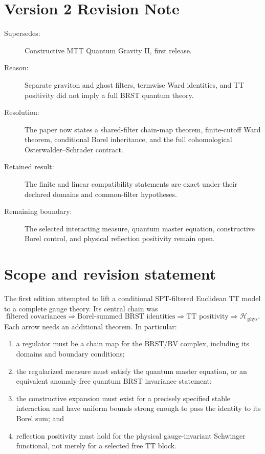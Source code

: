 \documentclass[11pt]{article}
\newcommand{\Hphys}{\mathcal H_{\mathrm{phys}}}
\begin{document}
\section*{Version 2 Revision Note}
\begin{description}
\item[Supersedes:] Constructive MTT Quantum Gravity II, first release.
\item[Reason:] Separate graviton and ghost filters, termwise Ward identities,
and TT positivity did not imply a full BRST quantum theory.
\item[Resolution:] The paper now states a shared-filter chain-map theorem,
finite-cutoff Ward theorem, conditional Borel inheritance, and the full
cohomological Osterwalder--Schrader contract.
\item[Retained result:] The finite and linear compatibility statements are
exact under their declared domains and common-filter hypotheses.
\item[Remaining boundary:] The selected interacting measure, quantum master
equation, constructive Borel control, and physical reflection positivity
remain open.
\end{description}

\tableofcontents

\section{Scope and revision statement}

The first edition attempted to lift a conditional SPT-filtered Euclidean TT
model to a complete gauge theory.  Its central chain was
\[
 \text{filtered covariances}
 \Longrightarrow \text{Borel-summed BRST identities}
 \Longrightarrow \text{TT positivity}
 \Longrightarrow \Hphys .
\]
Each arrow needs an additional theorem.  In particular:
\begin{enumerate}[label=\textup{(\roman*)}]
\item a regulator must be a chain map for the BRST/BV complex, including its
domains and boundary conditions;
\item the regularized measure must satisfy the quantum master equation, or an
equivalent anomaly-free quantum BRST invariance statement;
\item the constructive expansion must exist for a precisely specified stable
interaction and have uniform bounds strong enough to pass the identity to its
Borel sum; and
\item reflection positivity must hold for the physical gauge-invariant
Schwinger functional, not merely for a selected free TT block.
\end{enumerate}
\end{document}
